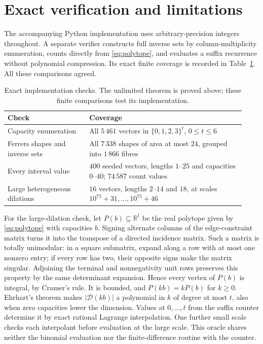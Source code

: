\documentclass[11pt]{article}
\theoremstyle{remark}
\newcommand{\R}{\mathbb R}
\newcommand{\card}[1]{\lvert #1\rvert}
\begin{document}
\section{Exact verification and limitations}

The accompanying Python implementation uses arbitrary-precision
integers throughout. A separate verifier constructs full inverse sets
by column-multiplicity enumeration, counts directly from
\eqref{eq:polytope}, and evaluates a suffix recurrence without
polynomial compression. Its exact finite coverage is recorded in
Table~\ref{tab:checks}. All these comparisons agreed.

\begin{table}[htbp]
\centering\small
\begin{tabular}{@{}p{0.32\linewidth}p{0.61\linewidth}@{}}
\toprule
Check & Coverage \\
\midrule
Capacity enumeration & All $5\,461$ vectors in
$\{0,1,2,3\}^t$, $0\leq t\leq6$ \\
Ferrers shapes and inverse sets & All $7\,338$ shapes of area at most
$24$, grouped into $1\,866$ fibres \\
Every interval value & $400$ seeded vectors, lengths $1$--$25$ and
capacities $0$--$40$; $74\,587$ count values \\
Large heterogeneous dilations & $16$ vectors, lengths $2$--$14$ and
$18$, at scales $10^{75}+31,\ldots,10^{75}+46$ \\
\bottomrule
\end{tabular}
\caption{Exact implementation checks. The unlimited theorem is proved
above; these finite comparisons test its implementation.}
\label{tab:checks}
\end{table}

For the large-dilation check, let $P(b)\subseteq\R^t$ be the real
polytope given by \eqref{eq:polytope} with capacities $b$.
Signing alternate columns of the edge-constraint matrix turns it
into the transpose of a directed incidence matrix. Such a matrix
is totally unimodular: in a square submatrix, expand along a row
with at most one nonzero entry; if every row has two, their opposite
signs make the matrix singular. Adjoining the terminal and
nonnegativity unit rows preserves this property by the same determinant
expansion. Hence every vertex of $P(b)$ is integral, by Cramer's rule.
It is bounded, and $P(kb)=kP(b)$ for $k\geq0$.
Ehrhart's theorem \cite[Theorem~3.8]{BR2015} makes
$\card{\mathcal D(kb)}$ a polynomial in $k$ of degree at most $t$,
also when zero capacities lower the dimension. Values at $0,\ldots,t$
from the suffix counter determine it by exact rational Lagrange
interpolation. One further small scale checks each interpolant before
evaluation at the large scale. This oracle shares neither the
binomial evaluation nor the finite-difference routine with the counter.
\end{document}
